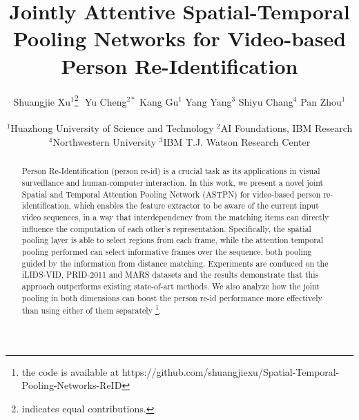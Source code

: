 \documentclass[10pt,twocolumn,letterpaper]{article}
\begin{document}
\title{Jointly Attentive Spatial-Temporal Pooling Networks for Video-based\\ Person Re-Identification}

\author{ 
Shuangjie Xu$^{1}$\thanks{indicates equal contributions.}\,\,  \hspace{0.1in} Yu Cheng$^{2*}$  \hspace{0.1in} Kang Gu$^1$   \hspace{0.1in} Yang Yang$^3$ \hspace{0.1in} Shiyu Chang$^4$ \hspace{0.1in} Pan Zhou$^1$\\ \\
$^1$Huazhong University of Science and Technology \hspace{0.2in} $^2$AI Foundations, IBM Research\hspace{0.2in} \\ $^4$Northwestern University \hspace{0.2in} $^3$IBM T.J. Watson Research Center \hspace{0.2in}
}

\maketitle


\begin{abstract}
Person Re-Identification (person re-id) is a crucial task as its applications in visual surveillance and human-computer interaction.  In this work, we present a novel joint Spatial and Temporal Attention Pooling Network (ASTPN) for video-based person re-identification, which enables the feature extractor to be aware of the current input video sequences, in a way that interdependency from the matching items can directly influence the computation of each other's representation. Specifically, the spatial pooling layer is able to select regions from each frame, while the attention temporal pooling performed can select informative frames over the sequence, both pooling guided by the information from distance matching. Experiments are conduced on the iLIDS-VID, PRID-2011 and MARS datasets and the results demonstrate that this approach outperforms existing state-of-art methods. We also analyze how the joint pooling in both dimensions can boost the person re-id performance more effectively than using either of them separately \footnote{the code is available at https://github.com/shuangjiexu/Spatial-Temporal-Pooling-Networks-ReID}. 
\end{abstract}
\end{document}
